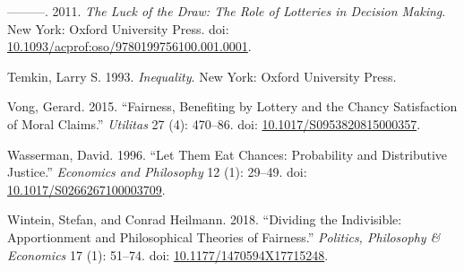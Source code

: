 \documentclass[
  11pt,
  letterpaper,
  DIV=11,
  numbers=noendperiod,
  twoside]{scrartcl}
\newlength{\cslhangindent}
\newenvironment{CSLReferences}[2] %
 {\begin{list}{}{%
  \setlength{\itemindent}{0pt}
  \setlength{\leftmargin}{0pt}
  \setlength{\parsep}{0pt}
  \ifodd #1
   \setlength{\leftmargin}{\cslhangindent}
   \setlength{\itemindent}{-1\cslhangindent}
  \fi
  \setlength{\itemsep}{#2\baselineskip}}}
 {\end{list}}
\begin{document}
\begin{CSLReferences}{1}{0}
---------. 2011. \emph{The Luck of the Draw: The Role of Lotteries in
Decision Making}. New York: Oxford University Press. doi:
\href{https://doi.org/10.1093/acprof:oso/9780199756100.001.0001}{10.1093/acprof:oso/9780199756100.001.0001}.

Temkin, Larry S. 1993. \emph{Inequality}. New York: Oxford University
Press.

Vong, Gerard. 2015. {``Fairness, Benefiting by Lottery and the Chancy
Satisfaction of Moral Claims.''} \emph{Utilitas} 27 (4): 470--86. doi:
\href{https://doi.org/10.1017/S0953820815000357}{10.1017/S0953820815000357}.

Wasserman, David. 1996. {``Let Them Eat Chances: Probability and
Distributive Justice.''} \emph{Economics and Philosophy} 12 (1): 29--49.
doi:
\href{https://doi.org/10.1017/S0266267100003709}{10.1017/S0266267100003709}.

Wintein, Stefan, and Conrad Heilmann. 2018. {``Dividing the Indivisible:
Apportionment and Philosophical Theories of Fairness.''} \emph{Politics,
Philosophy \& Economics} 17 (1): 51--74. doi:
\href{https://doi.org/10.1177/1470594X17715248}{10.1177/1470594X17715248}.

\end{CSLReferences}
\end{document}

